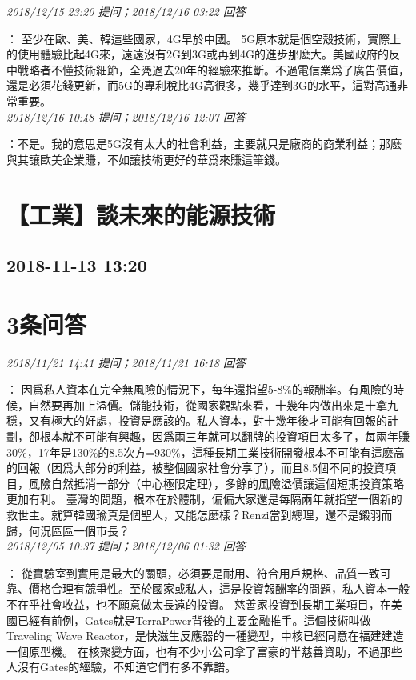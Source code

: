 \documentclass[twocolumn]{ctexart}
\begin{document}
\textit{\hfill\noindent\small 2018/12/15 23:20 提问；2018/12/16 03:22 回答}

：
至少在歐、美、韓這些國家，4G早於中國。
5G原本就是個空殼技術，實際上的使用體驗比起4G來，遠遠沒有2G到3G或再到4G的進步那麽大。美國政府的反中戰略者不懂技術細節，全凴過去20年的經驗來推斷。不過電信業爲了廣告價值，還是必須花錢更新，而5G的專利稅比4G高很多，幾乎達到3G的水平，這對高通非常重要。
\\

\textit{\hfill\noindent\small 2018/12/16 10:48 提问；2018/12/16 12:07 回答}

：不是。我的意思是5G沒有太大的社會利益，主要就只是廠商的商業利益；那麽與其讓歐美企業賺，不如讓技術更好的華爲來賺這筆錢。
\\


\section{【工業】談未來的能源技術}
\subsection{2018-11-13 13:20}


\section{3条问答}

\textit{\hfill\noindent\small 2018/11/21 14:41 提问；2018/11/21 16:18 回答}

：
因爲私人資本在完全無風險的情況下，每年還指望5-8\%的報酬率。有風險的時候，自然要再加上溢價。儲能技術，從國家觀點來看，十幾年内做出來是十拿九穩，又有極大的好處，投資是應該的。私人資本，對十幾年後才可能有回報的計劃，卻根本就不可能有興趣，因爲兩三年就可以翻牌的投資項目太多了，每兩年賺30\%，17年是130\%的8.5次方=930\%，這種長期工業技術開發根本不可能有這麽高的回報（因爲大部分的利益，被整個國家社會分享了），而且8.5個不同的投資項目，風險自然抵消一部分（中心極限定理），多餘的風險溢價讓這個短期投資策略更加有利。
臺灣的問題，根本在於體制，偏偏大家還是每隔兩年就指望一個新的救世主。就算韓國瑜真是個聖人，又能怎麽樣？Renzi當到總理，還不是鎩羽而歸，何況區區一個市長？
\\

\textit{\hfill\noindent\small 2018/12/05 10:37 提问；2018/12/06 01:32 回答}

：
從實驗室到實用是最大的關頭，必須要是耐用、符合用戶規格、品質一致可靠、價格合理有競爭性。至於國家或私人，這是投資報酬率的問題，私人資本一般不在乎社會收益，也不願意做太長遠的投資。
慈善家投資到長期工業項目，在美國已經有前例，Gates就是TerraPower背後的主要金融推手。這個技術叫做Traveling Wave Reactor，是快滋生反應器的一種變型，中核已經同意在福建建造一個原型機。
在核聚變方面，也有不少小公司拿了富豪的半慈善資助，不過那些人沒有Gates的經驗，不知道它們有多不靠譜。
\\
\end{document}
